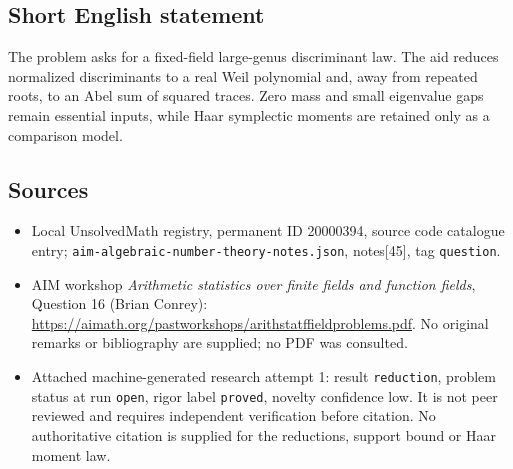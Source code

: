 \documentclass[11pt]{article}
\begin{document}
\subsection{Short English statement}
The problem asks for a fixed-field large-genus discriminant law. The aid reduces normalized discriminants to a real Weil polynomial and, away from repeated roots, to an Abel sum of squared traces. Zero mass and small eigenvalue gaps remain essential inputs, while Haar symplectic moments are retained only as a comparison model.
\subsection{Sources}
\begin{itemize}
\item Local UnsolvedMath registry, permanent ID 20000394, source code catalogue entry; \texttt{aim-algebraic-number-theory-notes.json}, notes[45], tag \texttt{question}.
\item AIM workshop \emph{Arithmetic statistics over finite fields and function fields}, Question 16 (Brian Conrey): \url{https://aimath.org/pastworkshops/arithstatffieldproblems.pdf}. No original remarks or bibliography are supplied; no PDF was consulted.
\item Attached machine-generated research attempt 1: result \texttt{reduction}, problem status at run \texttt{open}, rigor label \texttt{proved}, novelty confidence low. It is not peer reviewed and requires independent verification before citation. No authoritative citation is supplied for the reductions, support bound or Haar moment law.
\end{itemize}
\end{document}
